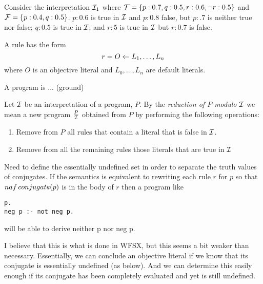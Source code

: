 \begin{example} 
Consider the interpretation $\cI_1$ where $\cT = \{p:0.7,q:0.5, r:0.6,
\ourneg r:0.5\}$ and $\cF = \{p:0.4, q:0.5\}$.  $p:0.6$ is true in
$\cI$ and $p:0.8$ false, but $p:.7$ is neither true nor false; $q:0.5$
is true in $\cI$; and $r:5$ is true in $\cI$ but $r:0.7$ is false.
\end{example}

\begin{definition}
A rule has the form
\[r = O \leftarrow{} L_1,\ldots,L_n\]
where $O$ is an objective literal and $L_0,\ldots,L_n$ are default
literals.

A program is ... (ground) 
\end{definition}


\begin{definition} \label{def:reduction}
%                                                                                
Let $\cI$ be an interpretation of a program, $P$.  By the {\em
  reduction of $P$ modulo $\cI$} we mean a new program $\frac{P}{\cI}$
obtained from $P$ by performing the following operations:
\begin{enumerate}
\item Remove from $P$ all rules that contain a literal that is false
  in $\cI$.
\item Remove from all the remaining rules those literals that are true
  in $\cI$
\end{enumerate}
\end{definition}

Need to define the essentially undefined set in order to separate the
truth values of conjugates.  If the semantics is equivalent to
rewriting each rule $r$ for $p$ so that ${naf}\, conjugate(p)$ is in the
body of $r$ then a program like 

\begin{verbatim} 
p.
neg p :- not neg p.
\end{verbatim}

\noindent
will be able to derive neither p nor neg p.

I believe that this is what is done in WFSX, but this seems a bit
weaker than necessary.  Essentially, we can conclude an objective
literal if we know that its conjugate is essentially undefined (as
below).  And we can determine this easily enough if its conjugate has
been completely evaluated and yet is still undefined.

